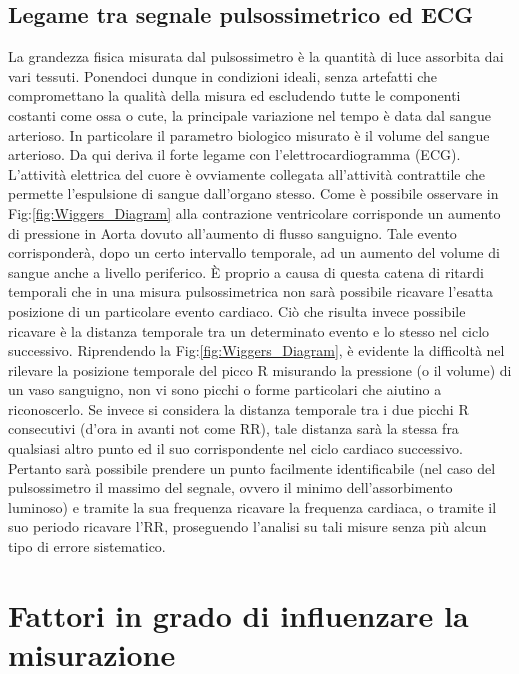 \documentclass[12pt,a4paper, twoside, openright]{report}
\begin{document}
\subsection{Legame tra segnale pulsossimetrico ed ECG}

La grandezza fisica misurata dal pulsossimetro è la quantità di luce assorbita dai vari tessuti.
Ponendoci dunque in condizioni ideali, senza artefatti che compromettano la qualità della misura ed escludendo tutte le componenti costanti come ossa o cute, la principale variazione nel tempo è data dal sangue arterioso.
In particolare il parametro biologico misurato è il volume del sangue arterioso.
Da qui deriva il forte legame con l'elettrocardiogramma (ECG).
L'attività elettrica del cuore è ovviamente collegata all'attività contrattile che permette l'espulsione di sangue dall'organo stesso.
Come è possibile osservare in Fig:\ref{fig:Wiggers_Diagram} alla contrazione ventricolare corrisponde un aumento di pressione in Aorta dovuto all'aumento di flusso sanguigno.
Tale evento corrisponderà, dopo un certo intervallo temporale, ad un aumento del volume di sangue anche a livello periferico.
È proprio a causa di questa catena di ritardi temporali che in una misura pulsossimetrica non sarà possibile ricavare l'esatta posizione di un particolare evento cardiaco.
Ciò che risulta invece possibile ricavare è la distanza temporale tra un determinato evento e lo stesso nel ciclo successivo.
Riprendendo la Fig:\ref{fig:Wiggers_Diagram}, è evidente la difficoltà nel rilevare la posizione temporale del picco R misurando la pressione (o il volume) di un vaso sanguigno, non vi sono picchi o forme particolari che aiutino a riconoscerlo.
Se invece si considera la distanza temporale tra i due picchi R consecutivi (d'ora in avanti not come RR), tale distanza sarà la stessa fra qualsiasi altro punto ed il suo corrispondente nel ciclo cardiaco successivo.
Pertanto sarà possibile prendere un punto facilmente identificabile (nel caso del pulsossimetro il massimo del segnale, ovvero il minimo dell'assorbimento luminoso) e tramite la sua frequenza ricavare la frequenza cardiaca, o tramite il suo periodo ricavare l'RR, proseguendo l'analisi su tali misure senza più alcun tipo di errore sistematico.



\section{Fattori in grado di influenzare la misurazione}
\end{document}
